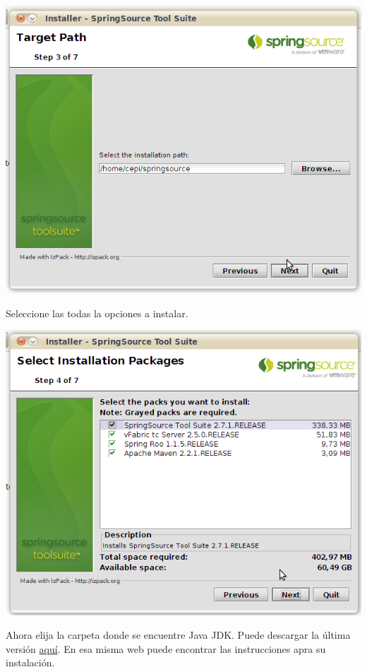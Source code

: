 \documentclass[a4paper,12pt,spanish]{article}
\begin{document}
\begin{center}
\includegraphics[scale=0.5]{ide3}
\end{center}

Seleccione las todas la opciones a instalar.

\begin{center}
\includegraphics[scale=0.5]{ide4}
\end{center}

Ahora elija la carpeta donde se encuentre Java JDK. Puede descargar la última versión \href{http://download.oracle.com/javase/7/docs/webnotes/install/linux/linux-jdk.html}{aquí}. En esa misma web puede encontrar las instrucciones apra su instalación.
\end{document}
